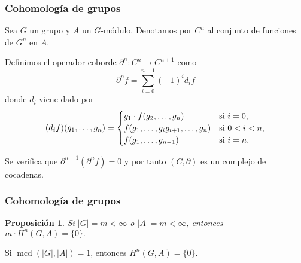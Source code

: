 \documentclass[
	11pt, %
]{beamer}
\DeclareMathOperator{\mcd}{mcd}
\newcommand{\ord}[1]{\left|#1\right|}%
\newcommand{\homo}[3]{#1\colon #2\to #3}
\newtheorem{proposition}{Proposici\'on}
\begin{document}
\begin{frame}
	\frametitle{Cohomología de grupos}
	
	Sea $G$ un grupo y $A$ un $G$-módulo. Denotamos por $C^n$ al conjunto de funciones de $G^n$ en $A$.
	
	Definimos el operador coborde  $\homo {\partial^n} {C^n} {C^{n+1}}$ como
	\begin{equation*}
		\partial^n f = \sum\limits_{i=0}^{n+1} (-1)^{i} d_i f
	\end{equation*}
	donde $d_i$ viene dado por 
	\begin{equation*}
		(d_if)(g_1,\ldots,g_n) = 
		\begin{cases} 
			g_1\cdot f(g_2,\ldots,g_n) 				& \text{si $ i=0$}, \\
			f(g_1,\ldots,g_ig_{i+1},\ldots,g_n) 	& \text{si $ 0 < i <n$}, \\
			f(g_1,\ldots,g_{n-1}) 				& \text{si $ i=n$}.
		\end{cases}
	\end{equation*}
	
	Se verifica que $\partial^{n+1}(\partial^n f) = 0$ y por tanto $(C,\partial)$ es un complejo de cocadenas.
\end{frame}


%	
%	

\begin{frame}
	\frametitle{Cohomología de grupos}
	
	\begin{proposition}
		Si $\ord{G} = m<\infty$ o $\ord{A} = m<\infty$, entonces $m\cdot H^{n}(G,A) = \{0\}.$
	\end{proposition}
	
	\begin{theorem}
		Si $\mcd(\ord{G},\ord{A}) = 1$, entonces $H^{n}(G,A) = \{0\}.$
	\end{theorem}
\end{frame}
\end{document}
